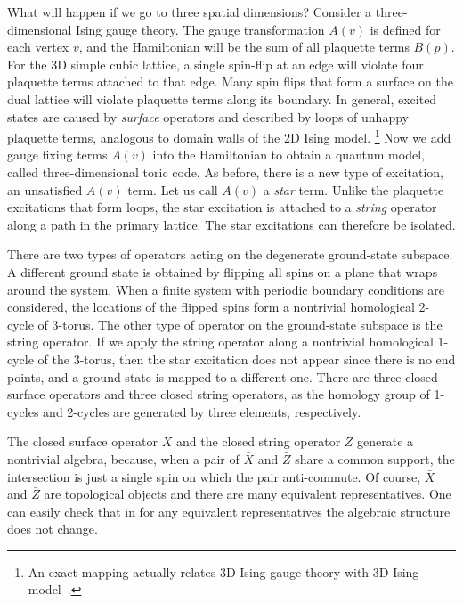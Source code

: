 What will happen if we go to three spatial dimensions? Consider a three-dimensional Ising gauge theory. The gauge transformation $A(v)$ is defined for each vertex $v$, and the Hamiltonian will be the sum of all plaquette terms $B(p)$. For the 3D simple cubic lattice, a single spin-flip at an edge will violate four plaquette terms attached to that edge. Many spin flips that form a surface on the dual lattice will violate plaquette terms along its boundary. In general, excited states are caused by \emph{surface} operators and described by loops of unhappy plaquette terms, analogous to domain walls of the 2D Ising model.%
\footnote{An exact mapping actually relates 3D Ising gauge theory with 3D Ising model~\cite{Wegner1971IsingGauge}.}
Now we add gauge fixing terms $A(v)$ into the Hamiltonian to obtain a quantum model, called three-dimensional toric code. As before, there is a new type of excitation, an unsatisfied $A(v)$ term. Let us call $A(v)$ a \emph{star} term. Unlike the plaquette excitations that form loops, the star excitation is attached to a \emph{string} operator along a path in the primary lattice. The star excitations can therefore be isolated.

There are two types of operators acting on the degenerate ground-state subspace. A different ground state is obtained by flipping all spins on a plane that wraps around the system. When a finite system with periodic boundary conditions are considered, the locations of the flipped spins form a nontrivial homological 2-cycle of 3-torus. The other type of operator on the ground-state subspace is the string operator. If we apply the string operator along a nontrivial homological 1-cycle of the 3-torus, then the star excitation does not appear since there is no end points, and a ground state is mapped to a different one. There are three closed surface operators and three closed string operators, as the homology group of 1-cycles and 2-cycles are generated by three elements, respectively.

The closed surface operator $\bar X$ and the closed string operator $\bar Z$ generate a nontrivial algebra, because, when a pair of $\bar X$ and $\bar Z$ share a common support, the intersection is just a single spin on which the pair anti-commute. Of course, $\bar X$ and $\bar Z$ are topological objects and there are many equivalent representatives. One can easily check that in for any equivalent representatives the algebraic structure does not change.


